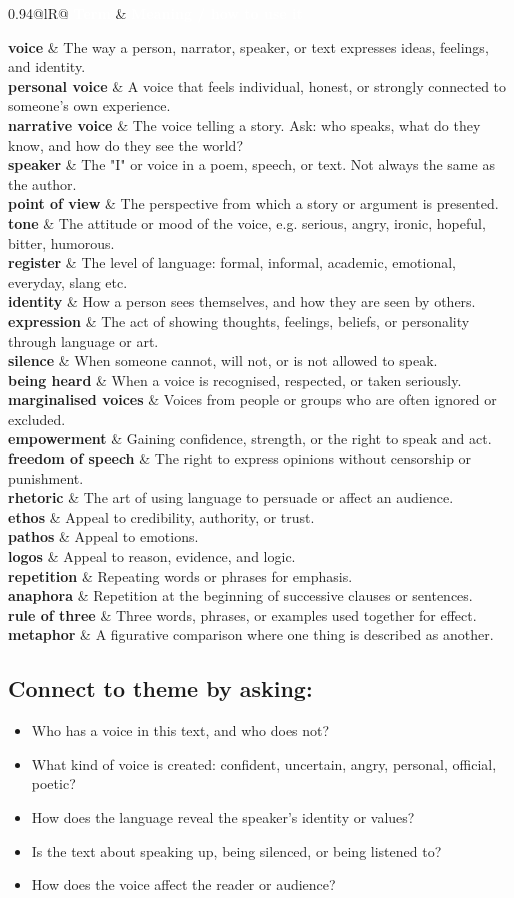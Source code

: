 \documentclass[10pt,a4paper]{article}
\makeatletter
\newcommand{\termrow}[2]{\textbf{#1} & #2 \\}
\newcommand{\termrowshaded}[2]{\rowcolor{rowgrey}\textbf{#1} & #2 \\}
\newcommand{\termtable}[1]{%
		\begin{center}
		\begin{tabularx}{0.94\textwidth}{@{}lR@{}}
		\toprule
		\rowcolor{frbgreen}\textcolor{white}{\textbf{Term}} & \textcolor{white}{\textbf{Meaning / how to use it}} \\
		\midrule
		#1
		\bottomrule
		\end{tabularx}
		\end{center}%
	}
\makeatother
\begin{document}
\termtable{
\termrow{voice}{The way a person, narrator, speaker, or text expresses ideas, feelings, and identity.}
\termrowshaded{personal voice}{A voice that feels individual, honest, or strongly connected to someone's own experience.}
\termrow{narrative voice}{The voice telling a story. Ask: who speaks, what do they know, and how do they see the world?}
\termrowshaded{speaker}{The "I" or voice in a poem, speech, or text. Not always the same as the author.}
\termrow{point of view}{The perspective from which a story or argument is presented.}
\termrowshaded{tone}{The attitude or mood of the voice, e.g. serious, angry, ironic, hopeful, bitter, humorous.}
\termrow{register}{The level of language: formal, informal, academic, emotional, everyday, slang etc.}
\termrowshaded{identity}{How a person sees themselves, and how they are seen by others.}
\termrow{expression}{The act of showing thoughts, feelings, beliefs, or personality through language or art.}
\termrowshaded{silence}{When someone cannot, will not, or is not allowed to speak.}
\termrow{being heard}{When a voice is recognised, respected, or taken seriously.}
\termrowshaded{marginalised voices}{Voices from people or groups who are often ignored or excluded.}
\termrow{empowerment}{Gaining confidence, strength, or the right to speak and act.}
\termrowshaded{freedom of speech}{The right to express opinions without censorship or punishment.}
\termrow{rhetoric}{The art of using language to persuade or affect an audience.}
\termrowshaded{ethos}{Appeal to credibility, authority, or trust.}
\termrow{pathos}{Appeal to emotions.}
\termrowshaded{logos}{Appeal to reason, evidence, and logic.}
\termrow{repetition}{Repeating words or phrases for emphasis.}
\termrowshaded{anaphora}{Repetition at the beginning of successive clauses or sentences.}
\termrow{rule of three}{Three words, phrases, or examples used together for effect.}
\termrowshaded{metaphor}{A figurative comparison where one thing is described as another.}
}

\subsection*{Connect to theme by asking:}

\begin{itemize}
	\item Who has a voice in this text, and who does not?
	\item What kind of voice is created: confident, uncertain, angry, personal, official, poetic?
	\item How does the language reveal the speaker's identity or values?
	\item Is the text about speaking up, being silenced, or being listened to?
	\item How does the voice affect the reader or audience?
\end{itemize}
\end{document}
